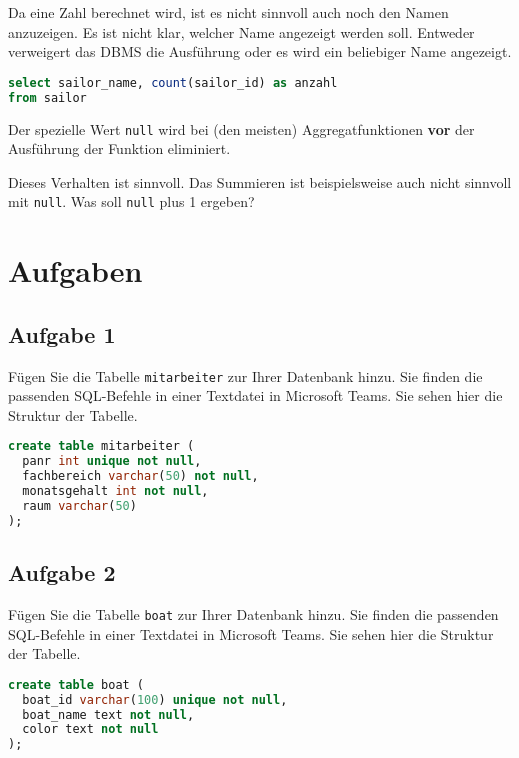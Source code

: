 \begin{example}
Da eine Zahl berechnet wird, ist es nicht sinnvoll auch noch den Namen anzuzeigen. Es ist nicht klar, welcher Name angezeigt werden soll. Entweder verweigert das \ac{DBMS} die Ausführung oder es wird ein beliebiger Name angezeigt.
\begin{lstlisting}[showstringspaces=off, language=SQL]
select sailor_name, count(sailor_id) as anzahl
from sailor
\end{lstlisting}
\end{example}

\begin{important}
Der spezielle Wert \lstinline{null} wird bei (den meisten) Aggregatfunktionen \textbf{vor} der Ausführung der Funktion eliminiert.
\end{important}

Dieses Verhalten ist sinnvoll. Das Summieren ist beispielsweise auch nicht sinnvoll mit \lstinline{null}. Was soll \lstinline{null} plus 1 ergeben?

\section{Aufgaben}

\subsection{Aufgabe 1}

Fügen Sie die Tabelle \lstinline{mitarbeiter} zur Ihrer Datenbank hinzu. Sie finden die passenden \ac{SQL}-Befehle in einer Textdatei in Microsoft Teams. Sie sehen hier die Struktur der Tabelle.

\begin{lstlisting}[language=SQL]
create table mitarbeiter (
  panr int unique not null,
  fachbereich varchar(50) not null,
  monatsgehalt int not null,
  raum varchar(50)
);
\end{lstlisting}

\subsection{Aufgabe 2}

Fügen Sie die Tabelle \lstinline{boat} zur Ihrer Datenbank hinzu. Sie finden die passenden \ac{SQL}-Befehle in einer Textdatei in Microsoft Teams. Sie sehen hier die Struktur der Tabelle.

\begin{lstlisting}[language=SQL]
create table boat (
  boat_id varchar(100) unique not null,
  boat_name text not null,
  color text not null
);
\end{lstlisting}

